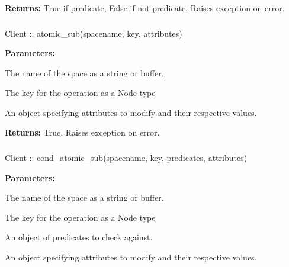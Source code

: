 \noindent\textbf{Returns:}
True if predicate, False if not predicate.  Raises exception on error.

\subsubsection{}
\label{api:nodejs:atomic_sub}
\begin{javascriptcode}
Client :: atomic_sub(spacename, key, attributes)
\end{javascriptcode}


\noindent\textbf{Parameters:}
\begin{description}[labelindent=\widthof{{\code{attributes}}},leftmargin=*,noitemsep,nolistsep,align=right]
\item[\code{spacename}] The name of the space as a string or buffer.
\item[\code{key}] The key for the operation as a Node type
\item[\code{attributes}] An object specifying attributes to modify and their respective values.
\end{description}

\noindent\textbf{Returns:}
True.  Raises exception on error.

\subsubsection{}
\label{api:nodejs:cond_atomic_sub}
\begin{javascriptcode}
Client :: cond_atomic_sub(spacename, key, predicates, attributes)
\end{javascriptcode}


\noindent\textbf{Parameters:}
\begin{description}[labelindent=\widthof{{\code{predicates}}},leftmargin=*,noitemsep,nolistsep,align=right]
\item[\code{spacename}] The name of the space as a string or buffer.
\item[\code{key}] The key for the operation as a Node type
\item[\code{predicates}] An object of predicates to check against.
\item[\code{attributes}] An object specifying attributes to modify and their respective values.
\end{description}

